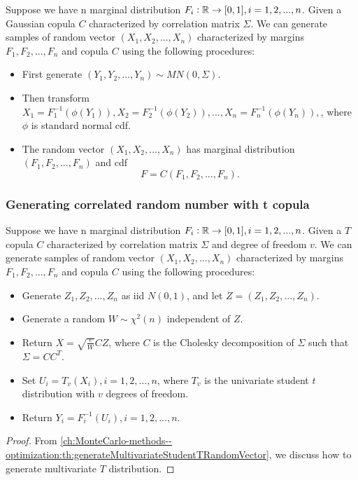 \begin{refsection}
\begin{corollary}\label{ch:statistical-models:th:GenerateCorrelatedRandomNumberWithGaussianCopula}
	Suppose we have n marginal distribution $F_i:\mathbb{R}\to [0,1], i=1,2,...,n$. Given a Gaussian copula $C$ characterized by correlation matrix  $\Sigma$. 	
	We can generate samples of random vector $(X_1,X_2, ...,X_n)$ characterized by margins $F_1,F_2,...,F_n$ and copula $C$ using the following procedures:
	\begin{itemize}
		\item First generate $(Y_1,Y_2,...,Y_n) \sim MN(0,\Sigma)$.
		\item Then transform $X_1 = F_1^{-1}(\phi(Y_1)),X_2 = F_2^{-1}(\phi(Y_2)), ...,X_n  = F_n^{-1}(\phi(Y_n)),$, where $\phi$ is standard normal cdf.
		\item The random vector $(X_1,X_2,...,X_n)$ has marginal distribution  $(F_1,F_2,...,F_n)$ and cdf
		$$F = C(F_1,F_2,...,F_n).$$	
	\end{itemize}
\end{corollary}





\subsubsection{Generating correlated random number with t copula}



\begin{lemma}\label{ch:statistical-models:th:GenerateCorrelatedRandomNumberWithTCopula}
	Suppose we have n marginal distribution $F_i:\mathbb{R}\to [0,1], i=1,2,...,n$. Given a $T$ copula $C$ characterized by correlation matrix  $\Sigma$ and degree of freedom $v$. 	
We can generate samples of random vector $(X_1,X_2, ...,X_n)$ characterized by margins $F_1,F_2,...,F_n$ and copula $C$ using the following procedures:
	\begin{itemize}
		\item Generate $Z_1,Z_2,...,Z_n$ as iid $N(0,1)$, and let $Z = (Z_1,Z_2,...,Z_n).$
		\item Generate a random $W\sim \chi^2(n)$ independent of $Z$.
		\item Return $X=\sqrt{\frac{v}{W}}CZ$, where $C$ is the Cholesky decomposition of $\Sigma$ such that $\Sigma = CC^T$.
		\item Set $U_i = T_v(X_i),i=1,2,...,n$, where $T_v$ is the univariate student $t$ distribution with $v$ degrees of freedom.
		\item Return $Y_i = F_i^{-1}(U_i),i=1,2,...,n$.
	\end{itemize}	
\end{lemma}
\begin{proof}
From 	
\autoref{ch:MonteCarlo-methods--optimization:th:generateMultivariateStudentTRandomVector}, we discuss how to generate multivariate $T$ distribution.
\end{proof}






\end{refsection}
